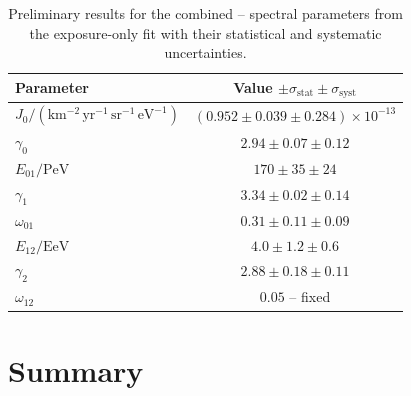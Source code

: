 \documentclass[main.tex]{subfiles}
\begin{document}
\begin{table}
    \centering
    \caption{
        Preliminary results for the combined -- spectral parameters from the exposure-only fit with their statistical and systematic uncertainties.
    }
    \label{table:combined_spectrum_parameters_systematics}
    \begin{tabular}{lc}
        \hline
        Parameter & Value $\pm\sigma_{\mathrm{stat}}\pm\sigma_{\mathrm{syst}}$ \\
        \hline
        $J_0/\left(\mathrm{km^{-2}\,yr^{-1}\,sr^{-1}\,eV^{-1}}\right)$
        & $(0.952\pm0.039\pm0.284)\times10^{-13}$ \\
        $\gamma_0$ & $2.94\pm0.07\pm0.12$ \\
        $E_{01}/\mathrm{PeV}$ & $170\pm35\pm24$ \\
        $\gamma_1$ & $3.34\pm0.02\pm0.14$ \\
        $\omega_{01}$ & $0.31\pm0.11\pm0.09$ \\
        $E_{12}/\mathrm{EeV}$ & $4.0\pm1.2\pm0.6$ \\
        $\gamma_2$ & $2.88\pm0.18\pm0.11$ \\
        $\omega_{12}$ & $0.05$ -- fixed \\
        \hline
    \end{tabular}
\end{table}

\section{Summary}
\end{document}
